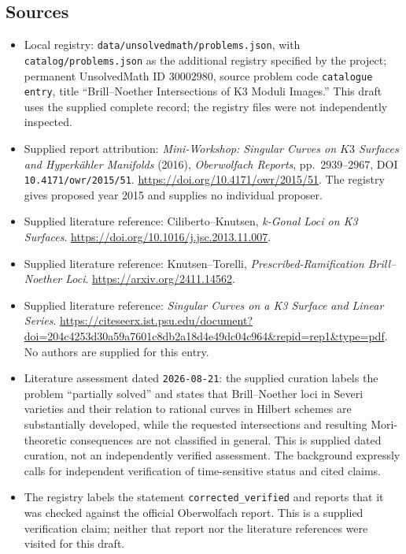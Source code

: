 \documentclass[11pt]{article}
\begin{document}
\subsection{Sources}
\begin{itemize}
\item Local registry: \texttt{data/unsolvedmath/problems.json}, with \texttt{catalog/problems.json} as the additional registry specified by the project; permanent UnsolvedMath ID \(30002980\), source problem code \texttt{catalogue entry}, title ``Brill--Noether Intersections of K3 Moduli Images.'' This draft uses the supplied complete record; the registry files were not independently inspected.
\item Supplied report attribution: \emph{Mini-Workshop: Singular Curves on \(K3\) Surfaces and Hyperkähler Manifolds} (2016), \emph{Oberwolfach Reports}, pp.~2939--2967, DOI \texttt{10.4171/owr/2015/51}. \url{https://doi.org/10.4171/owr/2015/51}. The registry gives proposed year 2015 and supplies no individual proposer.
\item Supplied literature reference: Ciliberto--Knutsen, \emph{k-Gonal Loci on K3 Surfaces}. \url{https://doi.org/10.1016/j.jsc.2013.11.007}.
\item Supplied literature reference: Knutsen--Torelli, \emph{Prescribed-Ramification Brill--Noether Loci}. \url{https://arxiv.org/2411.14562}.
\item Supplied literature reference: \emph{Singular Curves on a K3 Surface and Linear Series}. \url{https://citeseerx.ist.psu.edu/document?doi=204c4253d30a59a7601c8db2a18d4e49dc04c964&repid=rep1&type=pdf}. No authors are supplied for this entry.
\item Literature assessment dated \texttt{2026-08-21}: the supplied curation labels the problem ``partially solved'' and states that Brill--Noether loci in Severi varieties and their relation to rational curves in Hilbert schemes are substantially developed, while the requested intersections and resulting Mori-theoretic consequences are not classified in general. This is supplied dated curation, not an independently verified assessment. The background expressly calls for independent verification of time-sensitive status and cited claims.
\item The registry labels the statement \texttt{corrected\_verified} and reports that it was checked against the official Oberwolfach report. This is a supplied verification claim; neither that report nor the literature references were visited for this draft.
\end{itemize}
\end{document}

